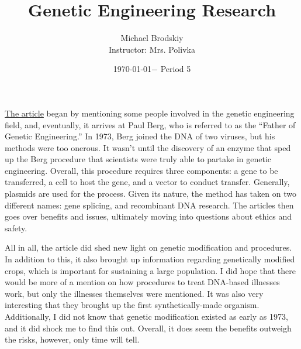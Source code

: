 \documentclass[12pt]{article}
\title{Genetic Engineering Research}
\date{\today $-$ Period 5}
\author{Michael Brodskiy\\ \small Instructor: Mrs. Polivka}
\begin{document}
\maketitle

\begin{justify}

  \href{https://go.gale.com/ps/retrieve.do?resultListType=RELATED_DOCUMENT\&searchType=ts\&userGroupName=waln177103\&inPS=true\&contentSegment=\&prodId=SCIC\&docId=GALE|OXRGLA933669590\&it=r}{The article} began by mentioning some people involved in the genetic engineering field, and, eventually, it arrives at Paul Berg, who is referred to as the ``Father of Genetic Engineering.'' In 1973, Berg joined the DNA of two viruses, but his methods were too onerous. It wasn't until the discovery of an enzyme that sped up the Berg procedure that scientists were truly able to partake in genetic engineering. Overall, this procedure requires three components: a gene to be transferred, a cell to host the gene, and a vector to conduct transfer. Generally, plasmids are used for the process. Given its nature, the method has taken on two different names: gene splicing, and recombinant DNA research. The articles then goes over benefits and issues, ultimately moving into questions about ethics and safety.

\end{justify}

\begin{justify}

  All in all, the article did shed new light on genetic modification and procedures. In addition to this, it also brought up information regarding genetically modified crops, which is important for sustaining a large population. I did hope that there would be more of a mention on how procedures to treat DNA-based illnesses work, but only the illnesses themselves were mentioned. It was also very interesting that they brought up the first synthetically-made organism. Additionally, I did not know that genetic modification existed as early as 1973, and it did shock me to find this out. Overall, it does seem the benefits outweigh the risks, however, only time will tell.

\end{justify}
\end{document}

